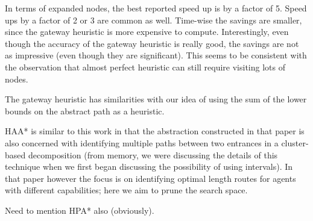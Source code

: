 In terms of expanded nodes, the best reported speed up is by a factor of 5.
Speed ups by a factor of 2 or 3 are common as well.
Time-wise the savings are smaller, since the gateway heuristic is more expensive to compute.
Interestingly, even though the accuracy of the gateway heuristic is really good,
the savings are not as impressive (even though they are significant).
This seems to be consistent with the observation that almost perfect heuristic
can still require visiting lots of nodes.

The gateway heuristic has similarities with our idea of using the sum of the lower bounds on the abstract path as a heuristic.

\par
HAA* is similar to this work in that the abstraction constructed in that paper is also concerned with identifying multiple paths between two entrances in a cluster-based decomposition (from memory, we were discussing the details of this technique when we first began discussing the possibility of using intervals). In that paper however the focus is on identifying optimal length routes for agents with different capabilities; here we aim to prune the search space. 
\par 
Need to mention HPA* also (obviously).

